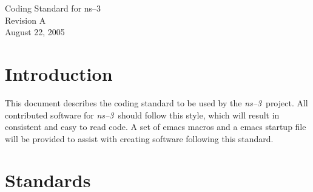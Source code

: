 \documentclass[11pt]{article}
\def\nst{{\em ns--3}}
\begin{document}
\begin{center}
{\Large Coding Standard for ns--3}\\
Revision A \\
August 22, 2005

\end{center}
\section{Introduction}
This document describes the coding standard to be used by the \nst\
project.  All contributed software for \nst\ should follow this
style, which will result in consistent and easy to read code.  A set
of emacs macros and a emacs startup file will be provided to assist
with creating software following this standard.

\section{Standards}
\end{document}
